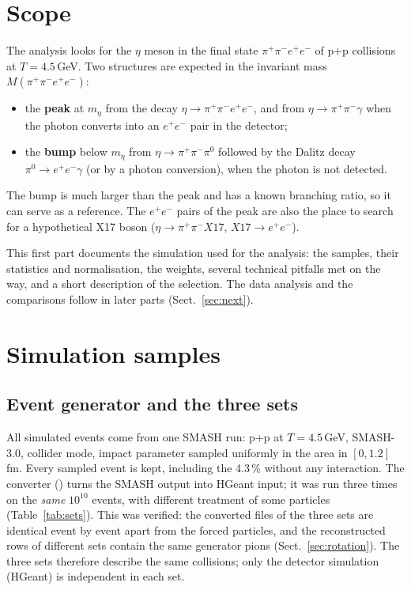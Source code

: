 \documentclass[11pt,a4paper]{article}
\newcommand{\piz}{\ensuremath{\pi^{0}}\xspace}
\newcommand{\ee}{\ensuremath{e^{+}e^{-}}\xspace}
\newcommand{\pipi}{\ensuremath{\pi^{+}\pi^{-}}\xspace}
\newcommand{\ppee}{\ensuremath{\pi^{+}\pi^{-}e^{+}e^{-}}\xspace}
\newcommand{\Mfour}{\ensuremath{M(\pi^{+}\pi^{-}e^{+}e^{-})}\xspace}
\newcommand{\code}[1]{\texttt{\detokenize{#1}}}
\begin{document}
\section{Scope}
\label{sec:scope}
The analysis looks for the $\eta$ meson in the final state $\ppee$ of p+p collisions at
$T = 4.5$\,GeV. Two structures are expected in the invariant mass $\Mfour$:
\begin{itemize}
\item the \textbf{peak} at $m_\eta$ from the decay $\eta\to\ppee$, and from
      $\eta\to\pipi\gamma$ when the photon converts into an \ee pair in the detector;
\item the \textbf{bump} below $m_\eta$ from $\eta\to\pipi\piz$ followed by the Dalitz decay
      $\piz\to\ee\gamma$ (or by a photon conversion), when the photon is not detected.
\end{itemize}
The bump is much larger than the peak and has a known branching ratio, so it can serve as a
reference. The \ee pairs of the peak are also the place to search for a hypothetical X17
boson ($\eta\to\pipi X17$, $X17\to\ee$).

This first part documents the simulation used for the analysis: the samples, their
statistics and normalisation, the weights, several technical pitfalls met on the way, and a
short description of the selection. The data analysis and the comparisons follow in later
parts (Sect.~\ref{sec:next}).

\section{Simulation samples}
\label{sec:samples}

\subsection{Event generator and the three sets}
All simulated events come from one SMASH run: p+p at $T = 4.5$\,GeV, SMASH-3.0, collider
mode, impact parameter sampled uniformly in the area in $[0, 1.2]$\,fm. Every sampled event
is kept, including the 4.3\,\% without any interaction. The converter (\code{convert-smash})
turns the SMASH output into HGeant input; it was run three times on the \emph{same}
$10^{10}$ events, with different treatment of some particles (Table~\ref{tab:sets}).
This was verified: the converted files of the three sets are identical event by event apart
from the forced particles, and the reconstructed rows of different sets contain the same
generator pions (Sect.~\ref{sec:rotation}). The three sets therefore describe the same
collisions; only the detector simulation (HGeant) is independent in each set.
\end{document}
